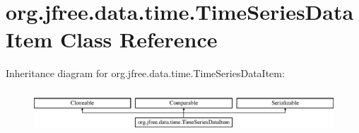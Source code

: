 \hypertarget{classorg_1_1jfree_1_1data_1_1time_1_1_time_series_data_item}{}\section{org.\+jfree.\+data.\+time.\+Time\+Series\+Data\+Item Class Reference}
\label{classorg_1_1jfree_1_1data_1_1time_1_1_time_series_data_item}
Inheritance diagram for org.\+jfree.\+data.\+time.\+Time\+Series\+Data\+Item\+:\begin{figure}[H]
\begin{center}
\leavevmode
\includegraphics[height=1.575246cm]{classorg_1_1jfree_1_1data_1_1time_1_1_time_series_data_item}
\end{center}
\end{figure}
